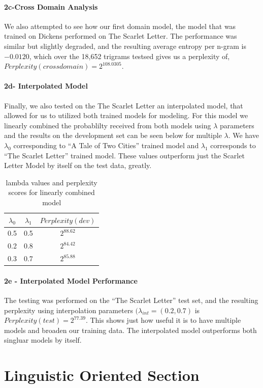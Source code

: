 \documentclass[paper=a4, fontsize=11pt]{scrartcl} %
\begin{document}
\paragraph{2c-Cross Domain Analysis}
We also attempted to see how our first domain model, the model that was trained on Dickens performed on The Scarlet Letter.  The performance was similar but slightly degraded, and the resulting average entropy per n-gram is $-0.0120$, which over the 18,652 trigrams testsed gives us  a perplexity of, $Perplexity(crossdomain) = 2^{108.0305}$.

\paragraph{2d- Interpolated Model}
Finally, we also tested on the The Scarlet Letter an interpolated model, that allowed for us to utilized both trained models for modeling.  For this model we linearly combined the probablilty received from both models using $\lambda$ parameters and the results on the development set can be seen below for multiple $\lambda$.  We have $\lambda_0$ corresponding to ``A Tale of Two Cities'' trained model and $\lambda_1$ corresponds to ``The Scarlet Letter'' trained model.  
These values outperform just the Scarlet Letter Model by itself on the test data, greatly.

\begin{table}
\centering
\label{tab:table2}
\caption{lambda values and perplexity scores for linearly combined model}
\begin{tabular}{|c|c|c|}
\hline
$\lambda_0$ & $\lambda_1$ & $Perplexity(dev)$ \\ \hline \hline
0.5 & 0.5 & $2^{88.62}$ \\ \hline
0.2 & 0.8 & $2^{84.42}$ \\ \hline
0.3 & 0.7 & $2^{85.88}$ \\ \hline
\end{tabular}
\end{table}

\paragraph{2e - Interpolated Model Performance}
The testing was performed on the ``The Scarlet Letter'' test set, and the resulting perplexity using interpolation parameters $(\lambda_{int} = (0.2,0.7)$ is $Perplexity(test) = 2^{77.39}$.  This shows just how useful it is to have multiple models and broaden our training data.  The interpolated model outperforms both singluar models by itself.

\section{Linguistic Oriented Section}
\end{document}
